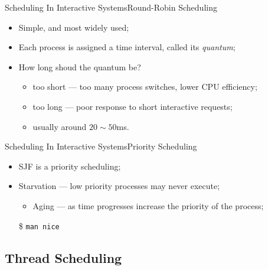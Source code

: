 \begin{frame}{Scheduling In Interactive Systems}{Round-Robin
    Scheduling}
  \begin{center}
     
  \end{center}
  \begin{itemize}
  \item Simple, and most widely used;
  \item Each process is assigned a time interval, called its \emph{quantum};
  \item How long shoud the quantum be?
    \begin{itemize}
    \item too short --- too many process switches, lower CPU efficiency;
    \item too long --- poor response to short interactive requests;
    \item usually around $20\sim{}50$ms.
    \end{itemize}
  \end{itemize}
\end{frame}

\begin{frame}{Scheduling In Interactive Systems}{Priority Scheduling}
  \begin{center}
  \end{center}
  \begin{itemize}
  \item SJF is a priority scheduling;
  \item \alert{Starvation} --- low priority processes may never execute;
    \begin{itemize}
    \item \alert{Aging} --- as time progresses increase the priority of the process;
    \end{itemize}
  \item[\$] \texttt{man nice}
  \end{itemize}  
\end{frame}

\subsection{Thread Scheduling}
\label{sec:thread-scheduling}

